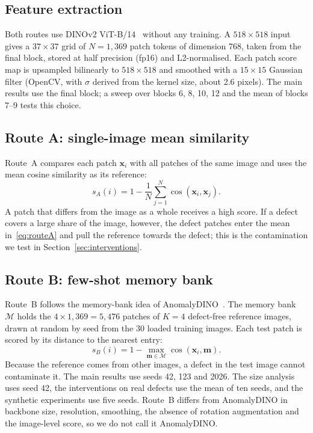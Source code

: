 \subsection{Feature extraction}
Both routes use DINOv2 ViT-B/14~\cite{oquab2024dinov2} without any training.
A $518\times518$ input gives a $37\times37$ grid of $N=1{,}369$ patch
tokens of dimension 768, taken from the final block, stored at half precision (fp16) and
L2-normalised. Each
patch score map is upsampled bilinearly to $518\times518$ and smoothed with a
$15\times15$ Gaussian filter (OpenCV, with $\sigma$ derived from the kernel
size, about 2.6 pixels). The main results use the final block; a sweep over
blocks 6, 8, 10, 12 and the mean of blocks 7--9 tests this choice.

\subsection{Route A: single-image mean similarity}
Route~A compares each patch $\mathbf{x}_i$ with all patches of the same
image and uses the mean cosine similarity as its reference:
\begin{equation}
  s_A(i) = 1 - \frac{1}{N}\sum_{j=1}^{N} \cos(\mathbf{x}_i,\mathbf{x}_j).
  \label{eq:routeA}
\end{equation}
A patch that differs from the image as a whole receives a high score. If a
defect covers a large share of the image, however, the defect patches enter
the mean in~\eqref{eq:routeA} and pull the reference towards the defect; this
is the contamination we test in Section~\ref{sec:interventions}.

\subsection{Route B: few-shot memory bank}
Route~B follows the memory-bank idea of AnomalyDINO~\cite{damm2025anomalydino}.
The memory bank $\mathcal{M}$ holds the $4\times1{,}369=5{,}476$ patches of
$K=4$ defect-free reference images, drawn at random by seed from the 30
loaded training images. Each test patch is scored by its distance to the
nearest entry:
\begin{equation}
  s_B(i) = 1 - \max_{\mathbf{m}\in\mathcal{M}} \cos(\mathbf{x}_i,\mathbf{m}).
  \label{eq:routeB}
\end{equation}
Because the reference comes from other images, a defect in the test image
cannot contaminate it. The main results use seeds 42, 123 and 2026. The size analysis
uses seed 42, the interventions on real defects use the mean of ten seeds,
and the synthetic experiments use five seeds. Route~B differs from AnomalyDINO in backbone
size, resolution, smoothing, the absence of rotation augmentation and the
image-level score, so we do not call it AnomalyDINO.

